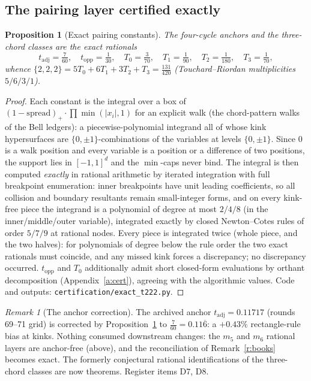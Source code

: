 \documentclass[11pt]{article}
\numberwithin{equation}{section}
\newtheorem{proposition}[theorem]{Proposition}
\theoremstyle{definition}
\theoremstyle{remark}
\newtheorem{remark}[theorem]{Remark}
\begin{document}
\subsection{The pairing layer certified exactly}\label{s:five:cert}

\begin{proposition}[Exact pairing constants]\label{p:t222}
The four-cycle anchors and the three-chord classes are the exact
rationals
\[
t_{\mathrm{adj}}=\tfrac7{60},\quad
t_{\mathrm{opp}}=\tfrac1{30},\quad
T_0=\tfrac3{70},\quad T_1=\tfrac1{90},\quad
T_2=\tfrac1{180},\quad T_3=\tfrac1{70},
\]
whence $\{2,2,2\}=5T_0+6T_1+3T_2+T_3=\tfrac{131}{420}$
(Touchard--Riordan multiplicities $5/6/3/1$).
\end{proposition}

\begin{proof}
Each constant is the integral over a box of
$(1-\mathrm{spread})_+\cdot\prod\min(|x_i|,1)$ for an explicit
walk (the chord-pattern walks of the Bell ledgers): a
piecewise-polynomial integrand all of whose kink hypersurfaces
are $\{0,\pm1\}$-combinations of the variables at levels
$\{0,\pm1\}$. Since $0$ is a walk position and every variable is
a position or a difference of two positions, the support lies in
$[-1,1]^d$ and the $\min$-caps never bind. The integral is then
computed \emph{exactly} in rational arithmetic by iterated
integration with full breakpoint enumeration: inner breakpoints
have unit leading coefficients, so all collision and boundary
resultants remain small-integer forms, and on every kink-free
piece the integrand is a polynomial of degree at most $2/4/8$ (in
the inner/middle/outer variable), integrated exactly by closed
Newton--Cotes rules of order $5/7/9$ at rational nodes. Every
piece is integrated twice (whole piece, and the two halves): for
polynomials of degree below the rule order the two exact
rationals must coincide, and any missed kink forces a
discrepancy; no discrepancy occurred. $t_{\mathrm{opp}}$ and
$T_0$ additionally admit short closed-form evaluations by orthant
decomposition (Appendix~\ref{a:cert}), agreeing with the
algorithmic values. Code and outputs:
\texttt{certification/exact\_t222.py}.
\end{proof}

\begin{remark}[The anchor correction]\label{r:anchor}
The archived anchor $t_{\mathrm{adj}}=0.11717$ (rounds 69--71
grid) is corrected by Proposition~\ref{p:t222} to
$\tfrac7{60}=0.11\overline{6}$: a $+0.43\%$ rectangle-rule bias
at kinks. Nothing consumed downstream changes: the $m_5$ and
$m_6$ rational layers are anchor-free (above), and the
reconciliation of Remark~\ref{r:books} becomes exact. The
formerly conjectural rational identifications of the three-chord
classes are now theorems. Register items D7, D8.
\end{remark}
\end{document}
